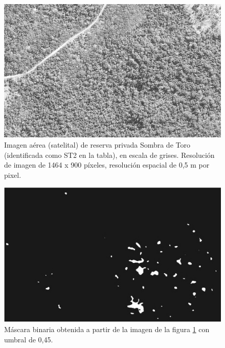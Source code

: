 

\begin{figure}[h!]
    \includegraphics[width=\textwidth]{Imagenes/Homomorfico/ST2.png}
     \hfill
     \caption{Imagen aérea (satelital) de reserva privada Sombra de Toro (identificada como ST2 en la tabla), en escala de grises. Resolución de imagen de 1464 x 900 píxeles, resolución espacial de 0,5 m por pixel.}
    \label{sombratorogris}
\end{figure}

\begin{figure}[h!]
    \includegraphics[width=\textwidth]{Imagenes/Homomorfico/ST2_bin.png}
     \hfill
     \caption{Máscara binaria obtenida a partir de la imagen de la figura \ref{sombratorogris} con umbral de 0,45.}
    \label{mascaraST}
\end{figure}

